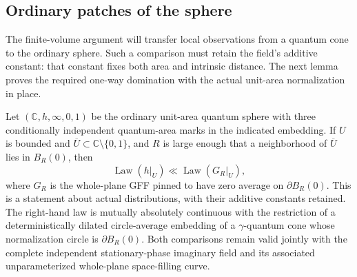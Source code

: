 \subsection{Ordinary patches of the sphere}

The finite-volume argument will transfer local observations from a quantum
cone to the ordinary sphere. Such a comparison must retain the field's
additive constant: that constant fixes both area and intrinsic distance.
The next lemma proves the required one-way domination with the actual
unit-area normalization in place.

\begin{lemma}\label{bg:sphere-field-ac}
Let \((\mathbb C,h,\infty,0,1)\) be the ordinary unit-area quantum
sphere with three conditionally independent quantum-area marks in the
indicated embedding. If \(U\) is bounded and
\(\overline U\subset\mathbb C\setminus\{0,1\}\), and \(R\) is large
enough that a neighborhood of \(\overline U\) lies in \(B_R(0)\), then
\[
 \operatorname{Law}(h|_U)
 \ll \operatorname{Law}(G_R|_U),
\]
where \(G_R\) is the whole-plane GFF pinned to have zero average on
\(\partial B_R(0)\). This is a statement about actual distributions,
with their additive constants retained. The right-hand law is mutually
absolutely continuous with the restriction of a deterministically
dilated circle-average embedding of a \(\gamma\)-quantum cone whose
normalization circle is \(\partial B_R(0)\). Both comparisons remain valid
jointly with the complete independent stationary-phase imaginary field
and its associated unparameterized whole-plane space-filling curve.
\end{lemma}

